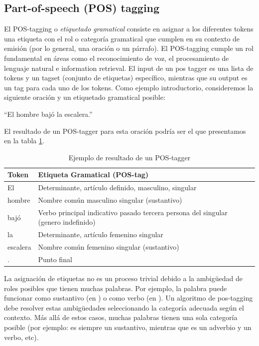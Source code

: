 \subsection{Part-of-speech (POS) tagging}
\label{subsec:pos}

El POS-tagging o \textit{etiquetado gramatical} consiste en asignar a los diferentes
tokens una etiqueta con el rol o categoría gramatical que cumplen en su contexto de emisión (por lo general, una oración o un párrafo).
El POS-tagging cumple un rol fundamental en áreas como el reconocimiento de voz, el procesamiento de lenguaje natural e information retrieval.
El input de un pos tagger es una lista de tokens y un tagset (conjunto de etiquetas) específico, mientras que su output es un tag para cada uno
de los tokens. Como ejemplo introductorio, consideremos la siguiente oración y un etiquetado gramatical posible:

\begin{center}
{\textquotedblleft}El hombre bajó la escalera.{\textquotedblright}
\end{center}
\medskip

El resultado de un POS-tagger para esta oración podría ser el que presentamos en la tabla \ref{table:ejemplos-postagger}.

\begin{center}
\begin{table}
\begin{tabular}{| l | l |}
 \hline
Token & Etiqueta Gramatical (POS-tag) \\ \hline
El  & Determinante, artículo definido, masculino, singular\\ \hline
hombre &  Nombre común masculino singular (sustantivo) \\ \hline
bajó  & Verbo principal indicativo pasado tercera persona del singular (genero indefinido)\\ \hline
la  & Determinante, artículo femenino singular \\ \hline
escalera & Nombre común femenino singular (sustantivo) \\ \hline
.  & Punto final\\ \hline
\end{tabular}
\caption{Ejemplo de resultado de un POS-tagger}
\label{table:ejemplos-postagger}
\end{table}
\end{center}

La asignación de etiquetas no es un proceso trivial debido a la ambigüedad de roles posibles que tienen muchas palabras. Por ejemplo, la palabra
 puede funcionar como sustantivo (en ) o como verbo (en ).
Un algoritmo de pos-tagging debe resolver estas ambigüedades seleccionando la categoría adecuada según el contexto. Más allá de estos casos, muchas palabras tienen una sola categoría posible (por ejemplo:  es siempre un sustantivo, mientras que  es un adverbio y  un verbo, etc).

